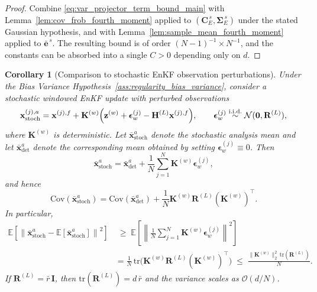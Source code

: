 \documentclass[11pt,a4paper]{article}
\newtheorem{corollary}{Corollary}
\begin{document}
\begin{proof}
Combine \eqref{eq:var_projector_term_bound_main} with Lemma~\ref{lem:cov_frob_fourth_moment} applied to $(\mathbf{C}_E^{\,s},\boldsymbol{\Sigma}_E^{\,s})$ under the stated Gaussian hypothesis, and with Lemma~\ref{lem:sample_mean_fourth_moment} applied to $\bar{\mathbf{e}}^{\,s}$. The resulting bound is of order $(N-1)^{-1}\times N^{-1}$, and the constants can be absorbed into a single $C>0$ depending only on $d$.
\end{proof}

\begin{corollary}[Comparison to stochastic EnKF observation perturbations]
\label{cor:stochastic_comparison_new}
Under the Bias Variance Hypothesis~\ref{ass:regularity_bias_variance}, consider a stochastic windowed EnKF update with perturbed observations
\begin{equation}
\mathbf{x}^{(j),a}_{\mathrm{stoch}}
=
\mathbf{x}^{(j),f}
+
\mathbf{K}^{(w)}\Bigl(\mathbf{z}^{(w)}+\boldsymbol{\epsilon}_{w}^{(j)}-\mathbf{H}^{(L)}\mathbf{x}^{(j),f}\Bigr),
\qquad
\boldsymbol{\epsilon}_{w}^{(j)}\stackrel{\mathrm{i.i.d.}}{\sim}\mathcal{N}(\mathbf{0},\mathbf{R}^{(L)}),
\end{equation}
where $\mathbf{K}^{(w)}$ is deterministic.
Let $\bar{\mathbf{x}}^{a}_{\mathrm{stoch}}$ denote the stochastic analysis mean and let $\bar{\mathbf{x}}^{a}_{\mathrm{det}}$
denote the corresponding mean obtained by setting $\boldsymbol{\epsilon}_{w}^{(j)}\equiv 0$. Then
\begin{equation}
\bar{\mathbf{x}}^{a}_{\mathrm{stoch}}
=
\bar{\mathbf{x}}^{a}_{\mathrm{det}}
+
\frac{1}{N}\sum_{j=1}^N \mathbf{K}^{(w)}\boldsymbol{\epsilon}_{w}^{(j)},
\end{equation}
and hence
\begin{equation}
\mathrm{Cov}\!\left(\bar{\mathbf{x}}^{a}_{\mathrm{stoch}}\right)
=
\mathrm{Cov}\!\left(\bar{\mathbf{x}}^{a}_{\mathrm{det}}\right)
+
\frac{1}{N}\mathbf{K}^{(w)}\mathbf{R}^{(L)}(\mathbf{K}^{(w)})^\top.
\end{equation}
In particular,
\begin{equation}
\label{eq:stoch_var_bound_new}
\begin{split}
\mathbb{E}\!\left[\left\|\bar{\mathbf{x}}^{a}_{\mathrm{stoch}}-\mathbb{E}[\bar{\mathbf{x}}^{a}_{\mathrm{stoch}}]\right\|^2\right]
&\;\ge\;
\mathbb{E}\!\left[\left\|\frac{1}{N}\sum_{j=1}^N \mathbf{K}^{(w)}\boldsymbol{\epsilon}_{w}^{(j)}\right\|^2\right]\\
&=
\frac{1}{N}\,\mathrm{tr}\!\bigl(\mathbf{K}^{(w)}\mathbf{R}^{(L)}(\mathbf{K}^{(w)})^\top\bigr)
\;\le\;
\frac{\|\mathbf{K}^{(w)}\|_2^2\,\mathrm{tr}(\mathbf{R}^{(L)})}{N}.
\end{split}
\end{equation}
If $\mathbf{R}^{(L)}=\bar r\,\mathbf{I}$, then $\mathrm{tr}(\mathbf{R}^{(L)})=d\,\bar r$ and the variance scales as
$\mathcal{O}(d/N)$.


\end{corollary}
\end{document}
